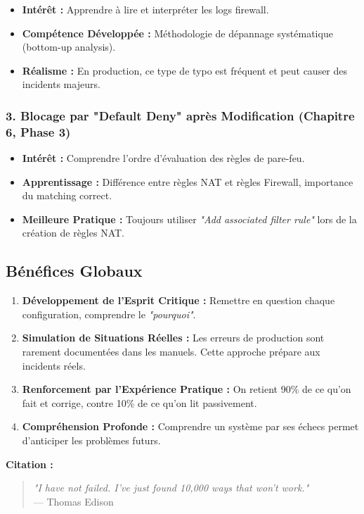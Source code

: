\documentclass[12pt,a4paper,openany]{report}
\begin{document}
	\begin{itemize}
		\item \textbf{Intérêt :} Apprendre à lire et interpréter les logs firewall.
		\item \textbf{Compétence Développée :} Méthodologie de dépannage systématique (bottom-up analysis).
		\item \textbf{Réalisme :} En production, ce type de typo est fréquent et peut causer des incidents majeurs.
	\end{itemize}
	
	\subsubsection{3. Blocage par "Default Deny" après Modification (Chapitre 6, Phase 3)}
	\begin{itemize}
		\item \textbf{Intérêt :} Comprendre l'ordre d'évaluation des règles de pare-feu.
		\item \textbf{Apprentissage :} Différence entre règles NAT et règles Firewall, importance du matching correct.
		\item \textbf{Meilleure Pratique :} Toujours utiliser \textit{"Add associated filter rule"} lors de la création de règles NAT.
	\end{itemize}
	
	\subsection{Bénéfices Globaux}
	\begin{enumerate}
		\item \textbf{Développement de l'Esprit Critique :} Remettre en question chaque configuration, comprendre le \textit{"pourquoi"}.
		\item \textbf{Simulation de Situations Réelles :} Les erreurs de production sont rarement documentées dans les manuels. Cette approche prépare aux incidents réels.
		\item \textbf{Renforcement par l'Expérience Pratique :} On retient 90\% de ce qu'on fait et corrige, contre 10\% de ce qu'on lit passivement.
		\item \textbf{Compréhension Profonde :} Comprendre un système par ses échecs permet d'anticiper les problèmes futurs.
	\end{enumerate}
	
	\textbf{Citation :} 
	\begin{quote}
		\textit{"I have not failed. I've just found 10,000 ways that won't work."}\\
		--- Thomas Edison
	\end{quote}
	
\end{document}
